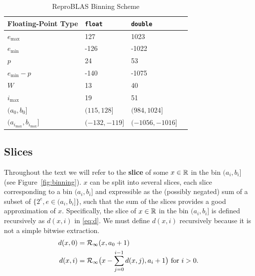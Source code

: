     \begin{table}[!htbp]
        \centering
        \begin{tabular}{ | l | l | l | p{5cm} |} \hline
            Floating-Point Type & \texttt{float} & \texttt{double}\\ \hline
            $e_{\max}$ & 127 & 1023\\ \hline
            $e_{\min}$ &  -126 & -1022 \\ \hline
            $p$ & 24 & 53 \\ \hline
            $e_{\min} - p$ & -140 & -1075 \\ \hline
            $W$ & 13 & 40 \\ \hline
            $i_{\max}$ & 19 & 51 \\ \hline
            $(a_0, b_0]$ & $(115, 128]$ & $(984, 1024]$\\ \hline
            $(a_{i_{\max}}, b_{i_{\max}}]$ & $(-132, -119]$ & $(-1056, -1016]$ \\ \hline
        \end{tabular}
        \caption{ReproBLAS Binning Scheme}
        \label{tbl:bins}
    \end{table}

    \subsection{Slices}
    \label{sec:binning_slices}
    Throughout the text we will refer to the \textbf{slice} of some $x \in \mathbb{R}$
    in the bin $(a_i, b_i]$ (see Figure~\ref{fig:binning}).
    $x$ can be split into several slices, each slice
    corresponding to a bin $(a_i, b_i]$ and expressible as the (possibly
    negated) sum of a subset of $\{2^e, e \in (a_i, b_i]\}$, such that the sum
    of the slices provides a good approximation of $x$. Specifically, the slice
    of $x \in \mathbb{R}$ in the bin $(a_i, b_i]$ is defined recursively as $d(x, i)$
    in \eqref{eq:d}. We must define $d(x, i)$ recursively because it is not a
    simple bitwise extraction.
    \begin{equation}
      \begin{aligned}
      d(x,0) & = \mathcal{R}_\text{$\infty$}(x, a_0+1) \\
      d(x, i) & = \mathcal{R}_\text{$\infty$}\bigl(x - \sum\limits_{j=0}^{i - 1}d(x,j), a_i + 1\bigr)
        \text{ for } i > 0.
      \end{aligned}
      \label{eq:d}
    \end{equation}

